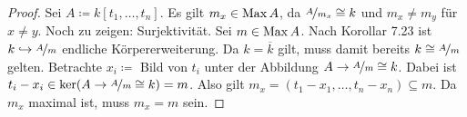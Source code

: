 \documentclass[12pt,a4paper]{scrartcl}
\theoremstyle{cplain}
\theoremstyle{cdef}
\begin{document}
\begin{proof}
	Sei $A\coloneqq k[t_1,\dots, t_n]$. Es gilt $m_x\in\operatorname{Max} A$, da $\nicefrac{A}{m_x}\cong k$ und $m_x\neq m_y$ für $x\neq y$. Noch zu zeigen: Surjektivität. Sei $m\in\operatorname{Max} A$. Nach Korollar 7.23 ist $k\hookrightarrow \nicefrac{A}{m}$ endliche Körpererweiterung. Da $k = \overline{k}$ gilt, muss damit bereits $k\cong \nicefrac{A}{m}$ gelten. Betrachte $x_i\coloneqq$ Bild von $t_i$ unter der Abbildung $A\to \nicefrac{A}{m}\cong k$. Dabei ist $t_i-x_i\in\operatorname{ker}(A\to \nicefrac{A}{m}\cong k) = m$. Also gilt $m_x = (t_1-x_1,\dots, t_n-x_n)\subseteq m$. Da $m_x$ maximal ist, muss $m_x= m$ sein.
\end{proof}
\end{document}
